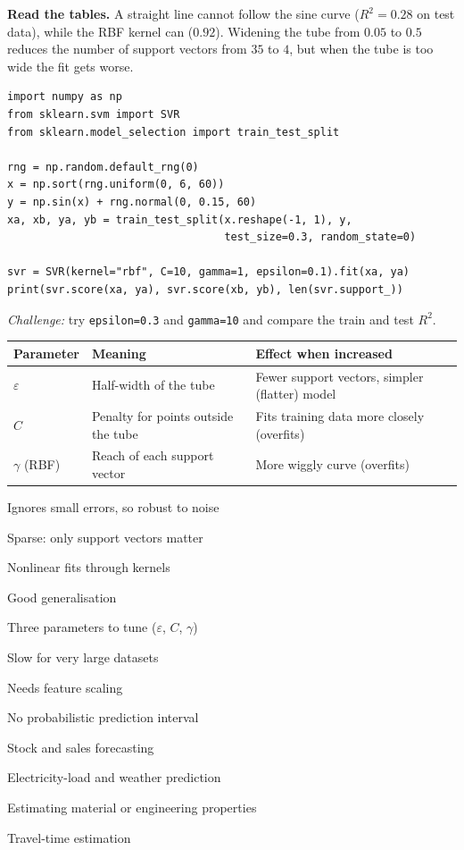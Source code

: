 \textbf{Read the tables.} A straight line cannot follow the sine curve ($R^2=0.28$ on test data), while the RBF kernel can ($0.92$). Widening the tube from $0.05$ to $0.5$ reduces the number of support vectors from $35$ to $4$, but when the tube is too wide the fit gets worse.

\begin{tryit}
\begin{lstlisting}
import numpy as np
from sklearn.svm import SVR
from sklearn.model_selection import train_test_split

rng = np.random.default_rng(0)
x = np.sort(rng.uniform(0, 6, 60))
y = np.sin(x) + rng.normal(0, 0.15, 60)
xa, xb, ya, yb = train_test_split(x.reshape(-1, 1), y,
                                  test_size=0.3, random_state=0)

svr = SVR(kernel="rbf", C=10, gamma=1, epsilon=0.1).fit(xa, ya)
print(svr.score(xa, ya), svr.score(xb, yb), len(svr.support_))
\end{lstlisting}
\emph{Challenge:} try \texttt{epsilon=0.3} and \texttt{gamma=10} and compare the train and test $R^2$.
\end{tryit}

\begin{center}
\begin{tabular}{@{}p{3.6cm}p{4.9cm}p{5.2cm}@{}}
\toprule
\textbf{Parameter} & \textbf{Meaning} & \textbf{Effect when increased}\\
\midrule
$\varepsilon$ & Half-width of the tube & Fewer support vectors, simpler (flatter) model\\
$C$ & Penalty for points outside the tube & Fits training data more closely (overfits)\\
$\gamma$ (RBF) & Reach of each support vector & More wiggly curve (overfits)\\
\bottomrule
\end{tabular}
\end{center}

{\item Ignores small errors, so robust to noise
 \item Sparse: only support vectors matter
 \item Nonlinear fits through kernels
 \item Good generalisation}
{\item Three parameters to tune ($\varepsilon$, $C$, $\gamma$)
 \item Slow for very large datasets
 \item Needs feature scaling
 \item No probabilistic prediction interval}
{\item Stock and sales forecasting
 \item Electricity-load and weather prediction
 \item Estimating material or engineering properties
 \item Travel-time estimation}

